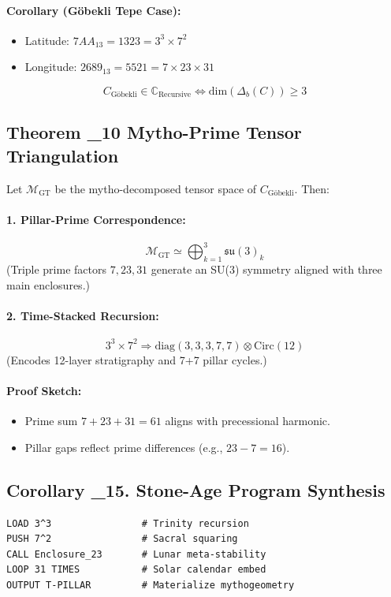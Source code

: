 \documentclass[12]{amsart}
\theoremstyle{plain}
\begin{document}
\paragraph{Corollary (G\"{o}bekli Tepe Case):}
\begin{itemize}
    \item Latitude: $7AA_{13} = 1323 = 3^3 \times 7^2$
    \item Longitude: $2689_{13} = 5521 = 7 \times 23 \times 31$
\end{itemize}

\[
C_{\text{G\"{o}bekli}} \in \mathbb{C}_{\text{Recursive}} \iff \text{dim}(\Delta_b(C)) \geq 3
\]

\subsection{Theorem \Xi_{10} \textendash{} Mytho-Prime Tensor Triangulation}

Let $\mathcal{M}_{\text{GT}}$ be the mytho-decomposed tensor space of $C_{\text{G\"{o}bekli}}$. Then:

\paragraph{1. Pillar-Prime Correspondence:}
\[
\mathcal{M}_{\text{GT}} \simeq \bigoplus_{k=1}^{3} \mathfrak{su}(3)_k
\]
(Triple prime factors $7, 23, 31$ generate an SU(3) symmetry aligned with three main enclosures.)

\paragraph{2. Time-Stacked Recursion:}
\[
3^3 \times 7^2 \Rightarrow \text{diag}(3, 3, 3, 7, 7) \otimes \text{Circ}(12)
\]
(Encodes 12-layer stratigraphy and 7+7 pillar cycles.)

\paragraph{Proof Sketch:}
\begin{itemize}
    \item Prime sum $7 + 23 + 31 = 61$ aligns with precessional harmonic.
    \item Pillar gaps reflect prime differences (e.g., $23 - 7 = 16$).
\end{itemize}

\subsection{Corollary \Xi_{15}.\tau \textendash{} Stone-Age Program Synthesis}
\begin{verbatim}
LOAD 3^3                # Trinity recursion
PUSH 7^2                # Sacral squaring
CALL Enclosure_23       # Lunar meta-stability
LOOP 31 TIMES           # Solar calendar embed
OUTPUT T-PILLAR         # Materialize mythogeometry
\end{verbatim}
\end{document}
